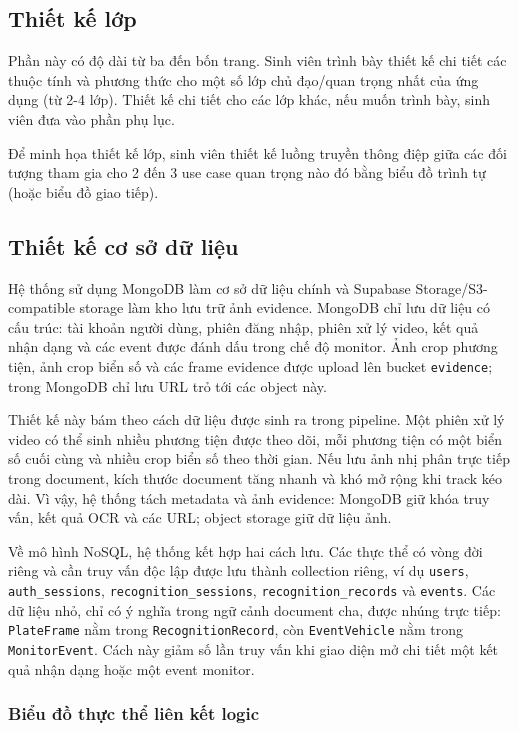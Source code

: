 \documentclass[../DoAn.tex]{subfiles}
\begin{document}
\subsection{Thiết kế lớp}
Phần này có độ dài từ ba đến bốn trang. Sinh viên trình bày thiết kế chi tiết các thuộc tính và phương thức cho một số lớp chủ đạo/quan trọng nhất của ứng dụng (từ 2-4 lớp). Thiết kế chi tiết cho các lớp khác, nếu muốn trình bày, sinh viên đưa vào phần phụ lục.

Để minh họa thiết kế lớp, sinh viên thiết kế luồng truyền thông điệp giữa các đối tượng tham gia cho 2 đến 3 use case quan trọng nào đó bằng biểu đồ trình tự (hoặc biểu đồ giao tiếp).
\subsection{Thiết kế cơ sở dữ liệu}

Hệ thống sử dụng MongoDB làm cơ sở dữ liệu chính và Supabase Storage/S3-compatible storage làm kho lưu trữ ảnh evidence. MongoDB chỉ lưu dữ liệu có cấu trúc: tài khoản người dùng, phiên đăng nhập, phiên xử lý video, kết quả nhận dạng và các event được đánh dấu trong chế độ monitor. Ảnh crop phương tiện, ảnh crop biển số và các frame evidence được upload lên bucket \texttt{evidence}; trong MongoDB chỉ lưu URL trỏ tới các object này.

Thiết kế này bám theo cách dữ liệu được sinh ra trong pipeline. Một phiên xử lý video có thể sinh nhiều phương tiện được theo dõi, mỗi phương tiện có một biển số cuối cùng và nhiều crop biển số theo thời gian. Nếu lưu ảnh nhị phân trực tiếp trong document, kích thước document tăng nhanh và khó mở rộng khi track kéo dài. Vì vậy, hệ thống tách metadata và ảnh evidence: MongoDB giữ khóa truy vấn, kết quả OCR và các URL; object storage giữ dữ liệu ảnh.

Về mô hình NoSQL, hệ thống kết hợp hai cách lưu. Các thực thể có vòng đời riêng và cần truy vấn độc lập được lưu thành collection riêng, ví dụ \texttt{users}, \texttt{auth\_sessions}, \texttt{recognition\_sessions}, \texttt{recognition\_records} và \texttt{events}. Các dữ liệu nhỏ, chỉ có ý nghĩa trong ngữ cảnh document cha, được nhúng trực tiếp: \texttt{PlateFrame} nằm trong \texttt{RecognitionRecord}, còn \texttt{EventVehicle} nằm trong \texttt{MonitorEvent}. Cách này giảm số lần truy vấn khi giao diện mở chi tiết một kết quả nhận dạng hoặc một event monitor.

\subsubsection{Biểu đồ thực thể liên kết logic}
\end{document}

